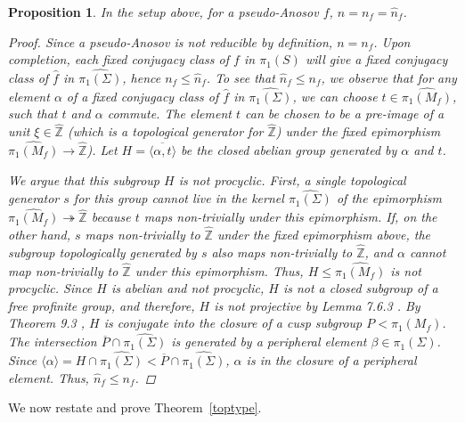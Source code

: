 \documentclass[12pt, reqno,oneside]{amsart}
\newtheorem{prop}[lemma]{Proposition}
\theoremstyle{definition}
\theoremstyle{plain}
\theoremstyle{TheoremNum}
\newcommand{\Z}{{\mathbb Z}}
\numberwithin{equation}{section}
\numberwithin{table}{section}
\begin{document}
\begin{prop}\label{keyprop}
In the setup above, for a pseudo-Anosov $f$, $n=n_f=\hat{n}_f$.
\begin{proof}
Since a pseudo-Anosov is not reducible by definition, $n=n_f$. Upon completion, each fixed conjugacy class of $f$ in $\pi_1(S)$ will give a fixed conjugacy class of $\hat{f}$ in $\widehat{\pi_1(\Sigma)}$, hence $n_f\leq \hat{n}_f$. To see that $\hat{n}_f\leq n_f$, we observe that for any element $\alpha$ of a fixed conjugacy class of $\hat{f}$ in $\widehat{\pi_1(\Sigma)}$, we can choose $t\in\widehat{\pi_1(M_{f})}$, such that $t$ and $\alpha$ commute. The element $t$ can be chosen to be a pre-image of a unit $\xi\in\hat{\Z}$ (which is a topological generator for $\hat{\Z}$) under the fixed epimorphism $\widehat{\pi_1(M_{f})}\to\hat{\Z}$). Let $H=\overline{\langle\alpha,t\rangle}$ be the closed abelian group generated by $\alpha$ and $t$. 
\par We argue that this subgroup $H$ is not procyclic. First, a single topological generator $s$ for this group cannot live in the kernel $\widehat{\pi_1(\Sigma)}$ of the epimorphism $\widehat{\pi_1(M_{f})}\twoheadrightarrow \hat{\Z}$ because $t$ maps non-trivially under this epimorphism. If, on the other hand, $s$ maps non-trivially to $\hat{\Z}$ under the fixed epimorphism above, the subgroup topologically generated by $s$ also maps non-trivially to $\hat{\Z}$, and $\alpha$ cannot map non-trivially to $\hat{\Z}$ under this epimorphism. Thus, $H\leq \widehat{\pi_1(M_{f})}$ is not procyclic. Since $H$ is abelian and not procyclic, $H$ is not a closed subgroup of a free profinite group, and therefore, $H$ is not projective by Lemma 7.6.3 \cite{RZ}. By Theorem 9.3 \cite{WZ1}, $H$ is conjugate into the closure of a cusp subgroup $P<\pi_1(M_{f})$. The intersection $\overline{P}\cap\widehat{\pi_1(\Sigma)}$ is generated by a peripheral element $\beta\in\pi_1(\Sigma)$. Since $\langle\alpha\rangle=H\cap \widehat{\pi_1(\Sigma)}<\overline{P}\cap\widehat{\pi_1(\Sigma)}$, $\alpha$ is in the closure of a peripheral element. Thus, $\hat{n}_f\leq n_f$. 
\end{proof}
\end{prop}
We now restate and prove Theorem~\ref{toptype}.
\end{document}
